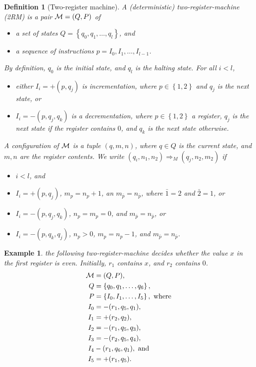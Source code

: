 \documentclass[openany]{scrbook}
\theoremstyle{break}
\newtheorem{Definition}[Theorem]{Definition}
\theoremstyle{nonumberbreak}
\newtheorem{Example}{Example}
\theoremstyle{nonumberplain}
\theoremstyle{nonumberbreak}
\newcommand{\then}{\Longrightarrow}
\newcommand{\set}[1]{\left\{#1\right\}}
\begin{document}
\begin{Definition}[Two-register machine]
  \label{7.10}
  A (deterministic) two-register-machine (2RM) is a pair ${\cal M} =
  (Q, P)$ of
  \begin{itemize}
    \item a set of states $Q = \set{q_0, q_1, \dotsc, q_l}$, and
    \item a sequence of instructions $p = I_0, I_1, \dotsc, I_{l -
        1}$.
  \end{itemize}

  By definition, $q_0$ is the initial state, and $q_l$ is the halting
  state. For all $i < l$,
  \begin{itemize}
  \item either $I_i = +(p, q_j)$ is incrementation, where $p \in
    \set{1, 2}$ and $q_j$ is the next state, or
  \item $I_i = -(p, q_j, q_k)$ is a decrementation, where $p \in \set{1,
      2}$ a register, $q_j$ is the next state if the register contains
    $0$, and $q_k$ is the next state otherwise.
  \end{itemize}

  A configuration of ${\cal M}$ is a tuple $(q, m, n)$, where $q \in
  Q$ is the current state, and $m, n$ are the register contents. We
  write $(q_i, n_1, n_2) \then_M (q_j, n_2, m_2)$ if
  \begin{itemize}
  \item $i < l$, and
  \item $I_i = +(p, q_j)$, $m_p = n_p + 1$, an $m_{\bar{p}} =
    n_{\bar{p}}$, where $\bar{1} = 2$ and $\bar{2} = 1$, or
  \item $I_i = -(p, q_j, q_k)$, $n_p = m_p = 0$, and $m_{\bar{p}} =
    n_{\bar{p}}$, or
  \item $I_i = -(p, q_k, q_j)$, $n_p > 0$, $m_p = n_p - 1$, and
    $m_{\bar{p}} = n_{\bar{p}}$.
  \end{itemize}
\end{Definition}

\begin{Example}
  the following two-register-machine decides whether the value $x$ in the
  first register is even. Initially, $r_1$ contains $x$, and $r_2$
  contains $0$.
  \begin{align*}
    {\cal M} & = (Q, P), \\
    Q & = \set{q_0, q_1, \dotsc, q_6}, \\
    P & = \set{I_0, I_1, \dotsc, I_5},\ \text{where} \\
    I_0 & = -(r_1, q_5, q_1), \\
    I_1 & = +(r_2, q_2), \\
    I_2 & = -(r_1, q_5, q_3), \\
    I_3 & = -(r_2, q_5, q_4), \\
    I_4 & -(r_1, q_6, q_1),\ \text{and} \\
    I_5 & = +(r_1, q_5).
  \end{align*}
\end{Example}
\end{document}
